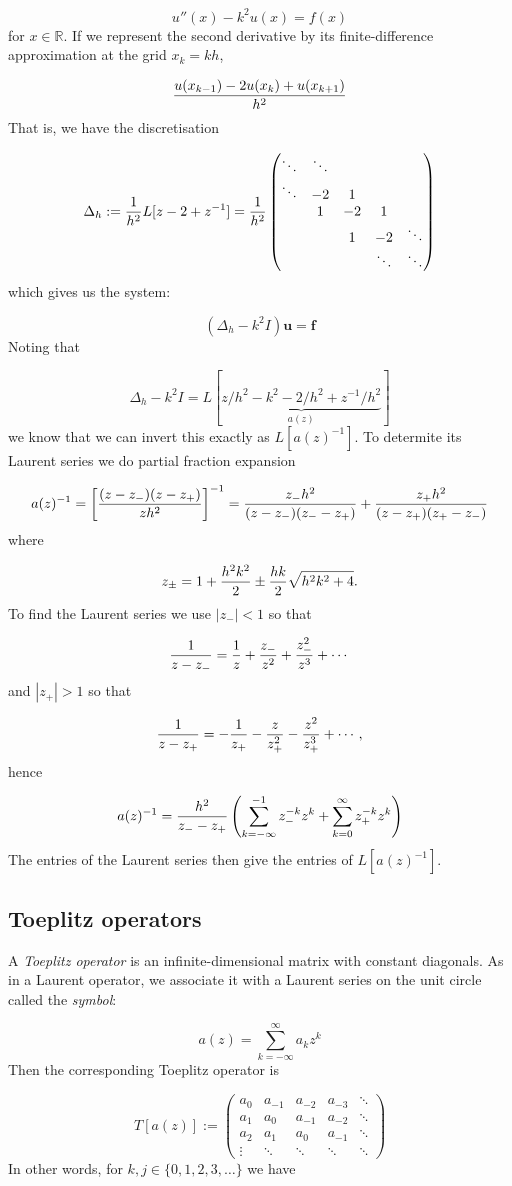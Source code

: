\documentclass[12pt,landscape]{article}
\def\R{ {\mathbb R} }
\def\vc#1{ {\mathbf #1} }
\def\br[#1]{\left[{#1}\right]}
\def\sopmatrix#1{ \begin{pmatrix}#1\end{pmatrix} }
\begin{document}
{\[
u''(x) - k^2 u(x) = f(x)
\]
for $x \in \R$. If we represent the second derivative by its finite-difference approximation at the grid $x_k = k h$,

\[
{u(x_{k-1}) -2 u(x_k) + u(x_{k+1}) \over h^2}
\]
That is, we have the discretisation

\[
\Delta_h := {1 \over h^2}L[z-2+z^{-1}] = {1 \over h^2} \sopmatrix{\ddots & \ddots \\
                \ddots & -2 & 1 \\
                & 1 & -2 & 1 \\
                && 1 & -2 & \ddots \\
                &&&\ddots & \ddots}
\]
which gives us the system:

\[
(\Delta_h - k^2 I) \vc u = \vc f
\]
Noting that

\[
\Delta_h - k^2 I  = L[\underbrace{z/h^2  - k^2 - 2/h^2 + z^{-1}/h^2}_{a(z)}]
\]
we know that we can invert this exactly as $L[a(z)^{-1}]$. To determite its Laurent series we do partial fraction expansion

\[
a(z)^{-1} = \br[{(z-z_-) (z - z_+) \over  z h^2} ]^{-1} =
{z_- h^2 \over (z-z_-) (z_--z_+)}  + {z_+ h^2 \over (z-z_+) (z_+-z_-)}
\]
where

\[
z_\pm = 1 + {h^2k^2 \over 2} \pm {h k \over 2} \sqrt{h^2 k^2+4}.
\]
To find the Laurent series we use $|z_-| < 1$ so that

\[
{1 \over z - z_-} = {1 \over z} + {z_- \over z^2} + {z_-^2 \over z^3} + \cdots
\]
and $|z_+| > 1$ so that

\[
{1 \over z - z_+} = -{1 \over z_+} - {z \over z_+^2} - {z^2 \over z_+^3} + \cdots,
\]
hence

\[
a(z)^{-1} = {h^2 \over z_- - z_+} \left(\sum_{k=-\infty}^{-1} z_-^{-k} z^k + \sum_{k=0}^\infty z_+^{-k} z^k\right)
\]
The entries of the Laurent series then give the entries of $L[a(z)^{-1}]$.

\subsection{Toeplitz operators}
A \emph{Toeplitz operator} is an infinite-dimensional matrix with constant diagonals. As in a Laurent operator, we associate it with a Laurent series on the unit circle called the \emph{symbol}:

\[
a(z) = \sum_{k=-\infty}^\infty a_k z^k
\]
Then the corresponding Toeplitz operator is

\[
T[a(z)] := \sopmatrix{
 a_0 & a_{-1} & a_{-2} & a_{-3} & \ddots \\
 a_1 & a_0 & a_{-1} & a_{-2} & \ddots \\
 a_2 & a_1 & a_0 & a_{-1}   & \ddots \\
\vdots & \ddots& \ddots& \ddots & \ddots
}
\]
In other words, for $k,j \in \{0,1,2,3,\dots \}$ we have

}
\end{document}
